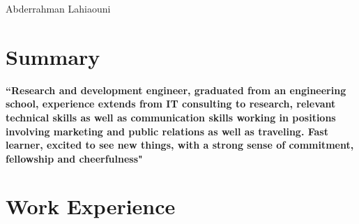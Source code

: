 \documentclass[10pt]{article} %
\begin{document}
\begin{paracol}{2} %


\parbox[top][0.12\textheight][c]{\linewidth}{ %
	\vspace{-0.04\textheight} %
	\centering %
	{\sffamily\Huge Abderrahman Lahiaouni}\\\medskip %
}




\section{Summary}

{\raggedright\textbf{``Research and development engineer, graduated from an engineering school, experience extends from IT consulting to research, relevant technical skills as well as communication skills working in positions involving marketing and public relations as well as traveling. Fast learner, excited to see new things, with a strong sense of commitment, fellowship and cheerfulness"} \medskip}


\medskip %


\section{Work Experience}




\end{paracol}
\end{document}

